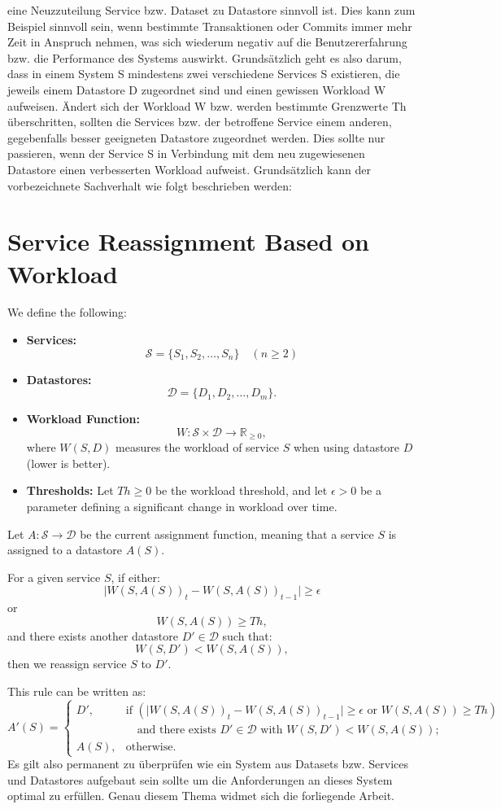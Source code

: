 eine Neuzzuteilung Service bzw. Dataset zu Datastore sinnvoll ist. Dies kann zum Beispiel sinnvoll sein,
wenn bestimmte Transaktionen oder Commits immer mehr Zeit in Anspruch nehmen, was sich wiederum
negativ auf die Benutzererfahrung bzw. die Performance des Systems auswirkt.
Grundsätzlich geht es also darum, dass in einem System S mindestens zwei verschiedene Services
S existieren,
die jeweils einem Datastore D zugeordnet sind und einen gewissen Workload W aufweisen. 
Ändert sich der Workload W bzw. werden bestimmte Grenzwerte Th überschritten, sollten die Services
bzw. der betroffene Service einem anderen, gegebenfalls besser geeigneten Datastore zugeordnet werden.
Dies sollte nur passieren, wenn der Service S in Verbindung mit dem neu zugewiesenen Datastore
einen verbesserten Workload aufweist.
Grundsätzlich kann der vorbezeichnete Sachverhalt wie folgt beschrieben werden:
\section*{Service Reassignment Based on Workload}

We define the following:

\begin{itemize}
    \item \textbf{Services:} 
    \[
    \mathcal{S} = \{ S_1, S_2, \ldots, S_n \} \quad (n \geq 2)
    \]
    \item \textbf{Datastores:} 
    \[
    \mathcal{D} = \{ D_1, D_2, \ldots, D_m \}.
    \]
    \item \textbf{Workload Function:} 
    \[
    W: \mathcal{S} \times \mathcal{D} \to \mathbb{R}_{\ge0},
    \]
    where \(W(S,D)\) measures the workload of service \(S\) when using datastore \(D\) (lower is better).
    \item \textbf{Thresholds:} Let \(Th \ge 0\) be the workload threshold, and let \(\epsilon > 0\) be a parameter defining a significant change in workload over time.
\end{itemize}

Let \(A: \mathcal{S} \to \mathcal{D}\) be the current assignment function, meaning that a service \(S\) is assigned to a datastore \(A(S)\).

For a given service \(S\), if either:
\[
\bigl|W(S, A(S))_t - W(S, A(S))_{t-1}\bigr| \ge \epsilon
\]
or
\[
W(S, A(S)) \ge Th,
\]
and there exists another datastore \(D' \in \mathcal{D}\) such that:
\[
W(S, D') < W(S, A(S)),
\]
then we reassign service \(S\) to \(D'\).

This rule can be written as:
\[
A'(S) =
\begin{cases}
D', & \text{if } \left( \bigl|W(S, A(S))_t - W(S, A(S))_{t-1}\bigr| \ge \epsilon \text{ or } W(S, A(S)) \ge Th \right) \\
    & \quad \text{and there exists } D' \in \mathcal{D} \text{ with } W(S, D') < W(S, A(S)); \\[1ex]
A(S), & \text{otherwise.}
\end{cases}
\]
Es gilt also permanent zu überprüfen wie ein System aus Datasets bzw. 
Services und Datastores aufgebaut sein sollte um die Anforderungen 
an dieses System optimal zu erfüllen. Genau diesem Thema widmet sich die forliegende Arbeit.
%
%
